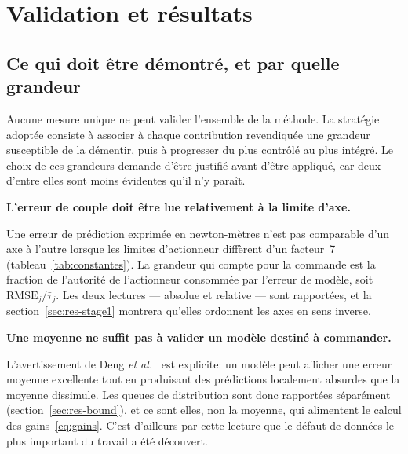 \documentclass[a4paper, oneside]{article}
\newcommand{\parag}[1]{%
    \par\medskip\noindent\textbf{#1}\ \ignorespaces%
}
\begin{document}
\section{Validation et résultats}
\label{sec:resultats}

\subsection{Ce qui doit être démontré, et par quelle grandeur}
\label{sec:res-quoi}

Aucune mesure unique ne peut valider l'ensemble de la méthode. La stratégie
adoptée consiste à associer à chaque contribution revendiquée une grandeur
susceptible de la démentir, puis à progresser du plus contrôlé au plus intégré.
Le choix de ces grandeurs demande d'être justifié avant d'être appliqué, car
deux d'entre elles sont moins évidentes qu'il n'y paraît.

\parag{L'erreur de couple doit être lue relativement à la limite d'axe.}
Une erreur de prédiction exprimée en newton-mètres n'est pas comparable d'un axe
à l'autre lorsque les limites d'actionneur diffèrent d'un facteur~7
(tableau~\ref{tab:constantes}). La grandeur qui compte pour la commande est la
fraction de l'autorité de l'actionneur consommée par l'erreur de modèle, soit
$\mathrm{RMSE}_j / \bar{\tau}_j$. Les deux lectures — absolue et relative — sont
rapportées, et la section~\ref{sec:res-stage1} montrera qu'elles ordonnent les
axes en sens inverse.

\parag{Une moyenne ne suffit pas à valider un modèle destiné à commander.}
L'avertissement de Deng \emph{et al.}~\cite{deng2024} est explicite: un modèle
peut afficher une erreur moyenne excellente tout en produisant des prédictions
localement absurdes que la moyenne dissimule. Les queues de distribution sont
donc rapportées séparément (section~\ref{sec:res-bound}), et ce sont elles, non
la moyenne, qui alimentent le calcul des gains~\eqref{eq:gains}. C'est
d'ailleurs par cette lecture que le défaut de données le plus important du
travail a été découvert.
\end{document}
